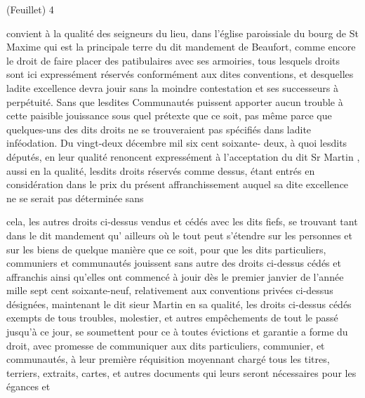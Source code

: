 \documentclass[a4paper,twoside,openany]{article}
\begin{document}

\begin{flushright}
(Feuillet) 4
\end{flushright}	
convient à la qualité des seigneurs du lieu, dans
l'église paroissiale du bourg de St Maxime qui est
la principale terre du dit mandement de Beaufort,
comme encore le droit de faire \gls{placer des
patibulaires avec ses armoiries}, tous lesquels droits
sont ici expressément réservés conformément
aux dites conventions, et desquelles ladite excellence
devra jouir sans la moindre contestation et ses
successeurs à perpétuité. Sans que lesdites Communautés
puissent apporter aucun trouble à cette paisible
jouissance sous quel prétexte que ce soit, pas même
parce que quelques-uns des dits droits ne se
trouveraient pas spécifiés dans ladite inféodation. 
Du vingt-deux décembre mil six cent soixante-
deux, à quoi lesdits députés, en leur qualité
renoncent expressément à l'acceptation du dit Sr
Martin
, aussi en la qualité, lesdits droits réservés
comme dessus, étant entrés en considération
dans le prix du présent affranchissement auquel
sa dite excellence ne se serait pas déterminée sans


cela, les autres droits ci-dessus vendus et cédés
avec les dits fiefs, se trouvant tant dans le dit
mandement qu’ ailleurs où le tout peut s’étendre
sur les personnes et sur les biens de quelque manière
que ce soit, pour que les dits particuliers, communiers
et communautés jouissent sans autre des droits
ci-dessus cédés et affranchis ainsi qu’elles ont
commencé à jouir dès le premier janvier de
l’année mille sept cent soixante-neuf, relativement
aux conventions privées ci-dessus désignées,
maintenant le dit sieur Martin en sa qualité, les
droits ci-dessus cédés exempts de tous troubles,
molestier, et autres empêchements de tout le passé
jusqu'à ce jour, se soumettent pour ce à toutes
évictions et garantie a forme du droit, avec
promesse de communiquer aux dits particuliers,
communier, et communautés, à leur première
réquisition moyennant chargé tous les titres,
terriers, extraits, cartes, et autres documents qui
leurs seront nécessaires pour les \gls{égances} et

\end{document}
